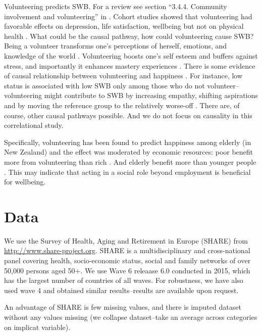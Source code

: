 \documentclass[10pt, letterpaper]{article}
\begin{document}
\begin{spacing}{1.4}
%
 Volunteering predicts SWB. For a review see section 
 ``3.4.4. Community involvement and volunteering'' in \citet{dolan08al}. Cohort
 studies showed that volunteering had favorable effects on depression, life
 satisfaction, wellbeing but not on physical health \citep{jenkinson2013volunteering}.
%
What could be the causal pathway, how could volunteering cause SWB? Being a
volunteer transforms one's perceptions of herself, emotions, and knowledge of
the world \citep{wilson12B}. %
Volunteering boosts one's self esteem and buffers against stress, and
importantly it enhances mastery experiences
\citep{wilson12B}. %
%
 There is  some evidence of causal relationship between volunteering and
 happiness \citep{meier2008volunteering,borgonovi2008doing}. For instance, low status is associated
with low SWB only among those who do not volunteer--volunteering
might contribute to SWB by increasing empathy, shifting aspirations and by
moving the reference group to the relatively worse-off
\citep{borgonovi2008doing}. There are, of course, other causal pathways
possible. And we do not focus on causality in this correlational study.

Specifically, volunteering has been found to predict happiness among elderly (in
New Zealand) and the effect was moderated by
economic resources: poor benefit more from volunteering than rich
\citep{dulin2012volunteering}. And elderly benefit more than  younger people
\citep{van2000differential,wahrendorf06}. This may indicate that acting in
a social role beyond employment is beneficial for wellbeing.


\section{Data} 

We use the Survey of Health, Aging and Retirement in Europe (SHARE) from
\url{http://www.share-project.org}.
 SHARE is a multidisciplinary and
cross-national panel covering health, socio-economic status,
social and family networks of over 50,000 persons aged 50$+$. 
We use  %
 Wave 6 releaase 6.0
 conducted  in 2015, which has the largest number of
countries of all waves. 
%
For robustness, we have also used wave 4 and obtained similar results--results
are available upon request.  


An advantage of SHARE is few missing values, 
 and there is imputed dataset without any values missing (we collapse dataset--take an average across categories on implicat variable). %


\end{spacing}
\end{document}
